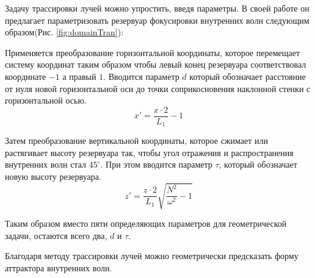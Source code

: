 Задачу трассировки лучей можно упростить, введя параметры. В своей работе он предлагает параметризовать резервуар фокусировки внутренних волн следующим образом(Рис. \ref{fig:domainTran}):

Применяется преобразование горизонтальной координаты, которое перемещает систему координат таким образом чтобы левый конец резервуара соответствовал координате $-1$ а правый $1$. Вводится параметр $d$ который обозначает расстояние от нуля новой горизонтальной оси до точки соприкосновения наклонной стенки с горизонтальной осью.
\begin{equation}
    x'=\frac{x\cdot 2}{L_1}-1
    \label{eq:transformX}
\end{equation}

Затем преобразование вертикальной координаты, которое сжимает или растягивает высоту резервуара так, чтобы угол отражения и распространения внутренних волн стал $45^\circ$. При этом вводится параметр $\tau$, который обозначает новую высоту резервуара. 
\begin{equation}
    z'=\frac{z\cdot 2}{L_1}\sqrt{\frac{N^2}{\omega^2}-1}
    \label{eq:transformZ}
\end{equation}

Таким образом вместо пяти определяющих параметров для геометрической задачи, остаются всего два, $d$ и $\tau$.

Благодаря методу трассировки лучей можно геометрически предсказать форму аттрактора внутренних волн. 

